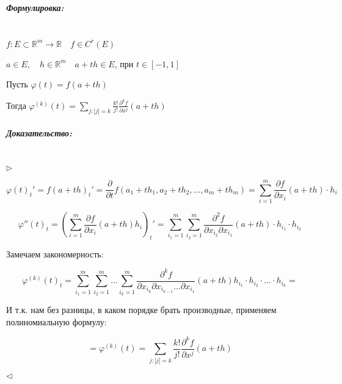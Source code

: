 \documentclass{article}
\let\vanillasubparagraph\subparagraph
\renewcommand{\subparagraph}[1]{\vanillasubparagraph{#1}\mbox{}\\}
\begin{document}
\subparagraph{Формулировка: }

$ f:E\subset \mathbb R ^m \to \mathbb R \quad f \in C^r(E)$

$ a \in E,\quad h \in \mathbb R ^m \quad a + th \in E$, при $t \in [-1, 1]$

Пусть $\varphi(t) = f(a + th)$

Тогда $\varphi^{(k)}(t) = \sum_{j: |j| = k} \frac {k!} {j!} \frac {\partial ^k f} {\partial x ^j} (a + th)$

\subparagraph{Доказательство: }

$\rhd$

$$
\varphi(t)_t' = f(a + th)_t' = \frac {\partial}{\partial t} f(a_1 + th_1, a_2 + th_2, \dots, a_m + th_m) = \sum_{i = 1}^m \frac{\partial f} {\partial x_i} (a + th) \cdot h_i
$$

$$
\varphi''(t)_t = \left(\sum_{i=1}^m \frac{\partial f} {\partial x_i} (a + th) h_i \right)_t' = \sum_{i_1=1}^m \sum_{i_2=1}^m \frac{\partial^2 f} {\partial x_{i_2} \partial x_{i_1}} (a + th) \cdot h_{i_1} \cdot h_{i_2}
$$

Замечаем закономерность:

$$
\varphi^{(k)}(t)_t = \sum_{i_1 = 1}^m \sum_{i_2 = 1}^m \dots \sum_{i_k = 1}^m \frac{\partial^k f}{\partial x_{i_k} \partial x_{i_{k-1}} \dots \partial x_{i_1}} (a + th) h_{i_1} \cdot h_{i_2} \cdot \dots \cdot h_{i_k} =
$$

И т.к. нам без разницы, в каком порядке брать производные, применяем полиномиальную формулу:

$$
= \varphi^{(k)}(t) = \sum_{j:  |j| = k} \frac{k!}{j!} \frac {\partial ^k f} {\partial x ^j} (a + th)
$$

$\lhd$
\end{document}
